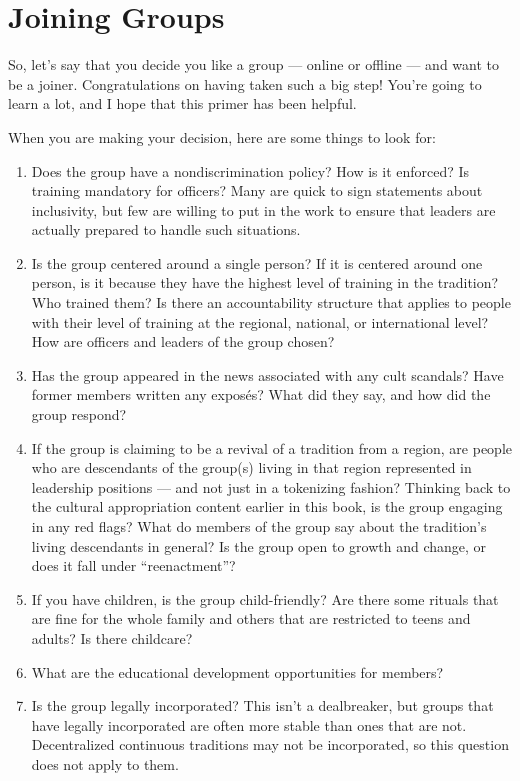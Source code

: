 \documentclass[
]{book}
\providecommand{\tightlist}{%
  \setlength{\itemsep}{0pt}\setlength{\parskip}{0pt}}
\begin{document}
\hypertarget{joining-groups}{%
\section{Joining Groups}\label{joining-groups}}

So, let's say that you decide you like a group --- online or offline --- and want to be a joiner. Congratulations on having taken such a big step! You're going to learn a lot, and I hope that this primer has been helpful.

When you are making your decision, here are some things to look for:

\begin{enumerate}
\def\labelenumi{\arabic{enumi}.}
\tightlist
\item
  Does the group have a nondiscrimination policy? How is it enforced? Is training mandatory for officers? Many are quick to sign statements about inclusivity, but few are willing to put in the work to ensure that leaders are actually prepared to handle such situations.
\item
  Is the group centered around a single person? If it is centered around one person, is it because they have the highest level of training in the tradition? Who trained them? Is there an accountability structure that applies to people with their level of training at the regional, national, or international level? How are officers and leaders of the group chosen?
\item
  Has the group appeared in the news associated with any cult scandals? Have former members written any exposés? What did they say, and how did the group respond?
\item
  If the group is claiming to be a revival of a tradition from a region, are people who are descendants of the group(s) living in that region represented in leadership positions --- and not just in a tokenizing fashion? Thinking back to the cultural appropriation content earlier in this book, is the group engaging in any red flags? What do members of the group say about the tradition's living descendants in general? Is the group open to growth and change, or does it fall under ``reenactment''?
\item
  If you have children, is the group child-friendly? Are there some rituals that are fine for the whole family and others that are restricted to teens and adults? Is there childcare?
\item
  What are the educational development opportunities for members?
\item
  Is the group legally incorporated? This isn't a dealbreaker, but groups that have legally incorporated are often more stable than ones that are not. Decentralized continuous traditions may not be incorporated, so this question does not apply to them.
\end{enumerate}
\end{document}
